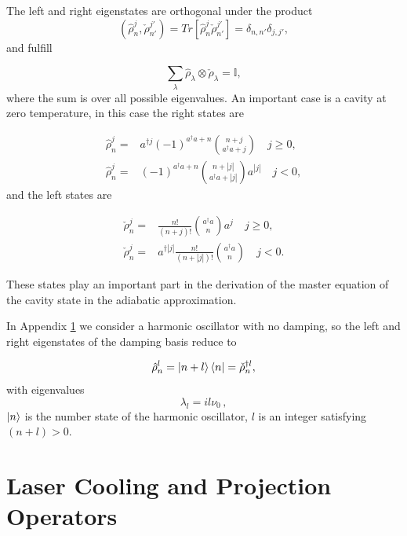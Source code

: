 \documentclass[reprint, amsmath,amssymb, aps,pra]{revtex4-1}
\begin{document}
The left and right eigenstates are orthogonal under the product
\begin{equation}
(\hat{\rho}_n^j,\check{\rho}_{n'}^{j'})=Tr[\hat{\rho}_n^j\check{\rho}_{n'}^{j'}] = \delta_{n,n'}\delta_{j,j'},
\end{equation} and fulfill

\begin{equation}\label{DampingBasisCompleteness}
\sum_{\lambda} \hat{\rho}_\lambda \otimes \check{\rho}_\lambda = \mathbb{I},
\end{equation} where the sum is over all possible eigenvalues. An important case is a cavity at zero temperature, in this case the right states are \cite{EnglertDB}

\begin{align}\label{DefDBZero}
\hat{\rho}_n^j=&a^{\dagger j}(-1)^{a^\dagger a + n}\binom{n+j}{a^\dagger a+j} \quad j \geq 0, \\
\hat{\rho}_n^j=&(-1)^{a^\dagger a + n}\binom{n+|j|}{a^\dagger a+|j|}a^{|j|} \quad j < 0,
\end{align} and the left states are

\begin{align}\label{DefDBDualZero}
\check{\rho}_n^j=&\frac{n!}{(n+j)!}\binom{a^\dagger a}{n}a^j \quad j \geq 0, \\
\check{\rho}_n^j=&a^{\dagger|j|}\frac{n!}{(n+|j|)!}\binom{a^\dagger a}{n} \quad j < 0.
\end{align}

These states play an important part in the derivation of the master
equation of the cavity state in the adiabatic approximation.

In Appendix \ref{CoolingAppendix} we consider a harmonic oscillator
with no damping, so the left and right eigenstates of the damping
basis reduce to

\begin{equation}
\hat{\rho}_{n}^{l}=\Ket{n+l}\Bra{n}=\check{\rho}_{n}^{\dagger l},
\end{equation}
with eigenvalues
\begin{equation}
\lambda_l = i l \nu_0\, ,
\end{equation}
$\Ket{n}$ is the number state of the harmonic oscillator, $l$ is an
integer satisfying $(n+l)>0$.


\section{Laser Cooling and Projection Operators}\label{CoolingAppendix}
\end{document}
